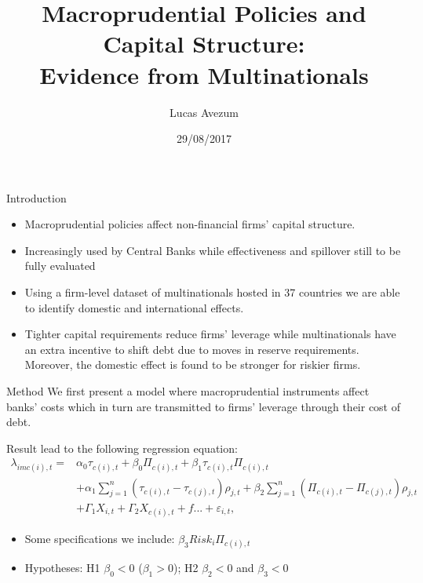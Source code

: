 \documentclass{beamer}
\title{Macroprudential Policies and Capital Structure: \\Evidence from Multinationals}
\author{Lucas Avezum}
\date{29/08/2017}
\begin{document}
	\begin{frame}
	\titlepage
\end{frame}
\begin{frame}{Introduction}
\begin{itemize}
	\item Macroprudential policies affect non-financial firms' capital structure.
	\item Increasingly used by Central Banks while effectiveness and spillover still to be fully evaluated 
	\item Using a firm-level dataset of multinationals hosted in 37 countries we are able to identify domestic and international effects.
	\item Tighter capital requirements reduce firms' leverage while multinationals have an extra incentive to shift debt due to moves in reserve requirements. Moreover, the domestic effect is found to be stronger for riskier firms.
\end{itemize}
\end{frame}


\begin{frame}{Method}
We first present a model where macroprudential instruments affect banks' costs which in turn are transmitted to firms' leverage through their cost of debt.

Result lead to the following regression equation:
\begin{equation}
\begin{aligned}
\lambda_{imc(i),t}=&\alpha_0\tau_{c(i),t}+\beta_0\Pi_{c(i),t}+\beta_1\tau_{c(i),t}\Pi_{c(i),t}\\
&+\alpha_1\sum_{j=1}^{n}(\tau_{c(i),t}-\tau_{c(j),t})\rho_{j,t}+\beta_2\sum_{j=1}^{n}(\Pi_{c(i),t}-\Pi_{c(j),t})\rho_{j,t}\\
&+\Gamma_1 X_{i,t}+\Gamma_2 X_{c(i),t}+ f...+\varepsilon_{i,t},
\label{eq:optimal leverage empirically 1}
\end{aligned}
\end{equation}
\begin{itemize}
	\item Some specifications we include: $\beta_3Risk_{i}\Pi_{c(i),t}$
	\item Hypotheses: H1 $\beta_0<0$ ($\beta_1>0$); H2   $\beta_2<0$ and $\beta_3<0$
\end{itemize}
\end{frame}
\end{document}
